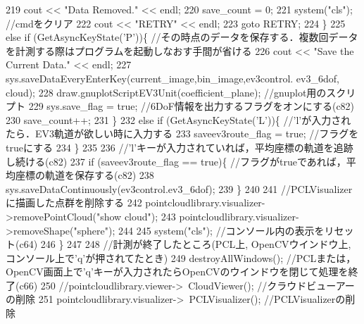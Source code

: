 \begin{DoxyCode}
219                 cout << \textcolor{stringliteral}{"Data Removed."} << endl;
220                 save_count = 0;
221                 system(\textcolor{stringliteral}{"cls"}); \textcolor{comment}{//cmdをクリア}
222                 cout << \textcolor{stringliteral}{"RETRY"} << endl;
223                 \textcolor{keywordflow}{goto} RETRY;
224             \}
225             \textcolor{keywordflow}{else} \textcolor{keywordflow}{if} (GetAsyncKeyState(\textcolor{charliteral}{'P'}))\{ \textcolor{comment}{//その時点のデータを保存する．複数回データを計測する際はプログラムを起動しなおす手間が省ける}
226                 cout << \textcolor{stringliteral}{"Save the Current Data."} << endl;
227                 sys.saveDataEveryEnterKey(current\_image,bin\_image,ev3control.
      ev3_6dof, cloud);
228                 draw.gnuplotScriptEV3Unit(coefficient\_plane); \textcolor{comment}{//gnuplot用のスクリプト}
229                 sys.save_flag = \textcolor{keyword}{true}; \textcolor{comment}{//6DoF情報を出力するフラグをオンにする(c82)}
230                 save_count++;
231             \}
232             \textcolor{keywordflow}{else} \textcolor{keywordflow}{if} (GetAsyncKeyState(\textcolor{charliteral}{'L'}))\{ \textcolor{comment}{//'l'が入力されたら．EV3軌道が欲しい時に入力する}
233                 saveev3route\_flag = \textcolor{keyword}{true}; \textcolor{comment}{//フラグをtrueにする}
234             \}
235 
236             \textcolor{comment}{//'l'キーが入力されていれば，平均座標の軌道を追跡し続ける(c82)}
237             \textcolor{keywordflow}{if} (saveev3route\_flag == \textcolor{keyword}{true})\{ \textcolor{comment}{//フラグがtrueであれば，平均座標の軌道を保存する(c82)}
238                 sys.saveDataContinuously(ev3control.ev3_6dof);
239             \}
240 
241             \textcolor{comment}{//PCLVisualizerに描画した点群を削除する}
242             pointcloudlibrary.visualizer->removePointCloud(\textcolor{stringliteral}{"show cloud"});
243             pointcloudlibrary.visualizer->removeShape(\textcolor{stringliteral}{"sphere"});
244 
245             system(\textcolor{stringliteral}{"cls"}); \textcolor{comment}{//コンソール内の表示をリセット(c64)}
246         \}
247 
248         \textcolor{comment}{//計測が終了したところ(PCL上, OpenCVウインドウ上, コンソール上で'q'が押されてたとき)}
249         destroyAllWindows(); \textcolor{comment}{//PCLまたは，OpenCV画面上で'q'キーが入力されたらOpenCVのウインドウを閉じて処理を終了(c66)}
250         \textcolor{comment}{//pointcloudlibrary.viewer->~CloudViewer(); //クラウドビューアーの削除}
251         pointcloudlibrary.visualizer->~PCLVisualizer(); \textcolor{comment}{//PCLVisualizerの削除}

\end{DoxyCode}
